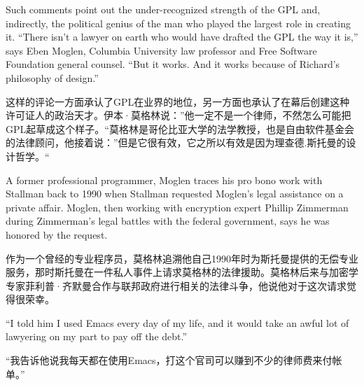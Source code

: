 \ifdefined\eng
Such comments point out the under-recognized strength of the GPL and, indirectly, the political genius of the man who played the largest role in creating it. ``There isn't a lawyer on earth who would have drafted the GPL the way it is,'' says Eben Moglen, Columbia University law professor and Free Software Foundation general counsel. ``But it works. And it works because of Richard's philosophy of design.''
\fi

\ifdefined\chs
这样的评论一方面承认了GPL在业界的地位，另一方面也承认了在幕后创建这种许可证人的政治天才。伊本·莫格林说：”他一定不是一个律师，不然怎么可能把GPL起草成这个样子。“莫格林是哥伦比亚大学的法学教授，也是自由软件基金会的法律顾问，他接着说：”但是它很有效，它之所以有效是因为理查德.斯托曼的设计哲学。“
\fi

\ifdefined\eng
A former professional programmer, Moglen traces his pro bono work with Stallman back to 1990 when Stallman requested Moglen's legal assistance on a private affair. Moglen, then working with encryption expert Phillip Zimmerman during Zimmerman's legal battles with the federal government, says he was honored by the request.
\fi

\ifdefined\chs
作为一个曾经的专业程序员，莫格林追溯他自己1990年时为斯托曼提供的无偿专业服务，那时斯托曼在一件私人事件上请求莫格林的法律援助。莫格林后来与加密学专家菲利普·齐默曼合作与联邦政府进行相关的法律斗争，他说他对于这次请求觉得很荣幸。
\fi

\ifdefined\eng
``I told him I used Emacs every day of my life, and it would take an awful lot of lawyering on my part to pay off the debt.''
\fi

\ifdefined\chs
“我告诉他说我每天都在使用Emacs，打这个官司可以赚到不少的律师费来付帐单。”
\fi


